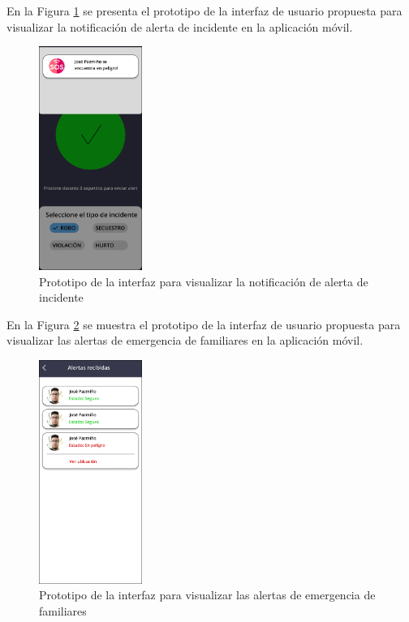 En la Figura \ref{fig:prototipo-notificacion-alerta} se presenta el prototipo de la interfaz de usuario propuesta para
visualizar la notificación de alerta de incidente en la aplicación móvil.

\begin{figure}[H]
      \centering
      \includegraphics[width=0.3\textwidth]{chapters/III-resultados-y-discusion/resources/images/prototipo-notificacion-alerta.png}
      \caption{Prototipo de la interfaz para visualizar la notificación de alerta de incidente}
      \label{fig:prototipo-notificacion-alerta}
\end{figure}

En la Figura \ref{fig:prototipo-alertas-mobile} se muestra el prototipo de la interfaz de usuario propuesta para
visualizar las alertas de emergencia de familiares en la aplicación móvil.

\begin{figure}[H]
      \centering
      \includegraphics[width=0.3\textwidth]{chapters/III-resultados-y-discusion/resources/images/prototipo-alertas-mobile.png}
      \caption{Prototipo de la interfaz para visualizar las alertas de emergencia de familiares}
      \label{fig:prototipo-alertas-mobile}
\end{figure}

